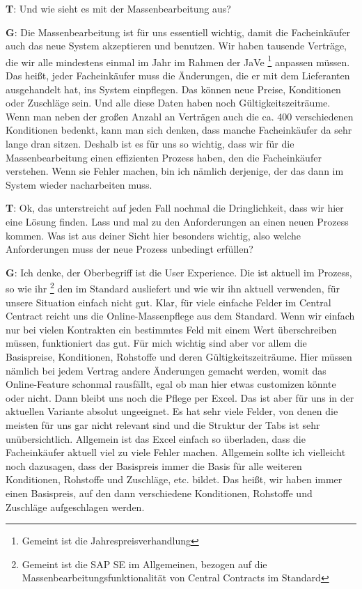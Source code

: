 \begin{list}{X:}{\setlength{\labelsep}{5mm}}
 \item[\textbf{T}:] Und wie sieht es mit der Massenbearbeitung aus?
 \item[\textbf{G}:] Die Massenbearbeitung ist für uns essentiell wichtig, damit die Facheinkäufer auch das neue System akzeptieren und benutzen. Wir haben tausende Verträge, die wir alle mindestens einmal im Jahr im Rahmen der JaVe \footnote{Gemeint ist die Jahrespreisverhandlung} anpassen müssen. Das hei\ss t, jeder Facheinkäufer muss die Änderungen, die er mit dem Lieferanten ausgehandelt hat, ins System einpflegen. Das können neue Preise, Konditionen oder Zuschläge sein. Und alle diese Daten haben noch Gültigkeitszeiträume. Wenn man neben der gro\ss en Anzahl an Verträgen auch die ca. 400 verschiedenen Konditionen bedenkt, kann man sich denken, dass manche Facheinkäufer da sehr lange dran sitzen. Deshalb ist es für uns so wichtig, dass wir für die Massenbearbeitung einen effizienten Prozess haben, den die Facheinkäufer verstehen. Wenn sie Fehler machen, bin ich nämlich derjenige, der das dann im System wieder nacharbeiten muss.
 \item[\textbf{T}:] Ok, das unterstreicht auf jeden Fall nochmal die Dringlichkeit, dass wir hier eine Lösung finden. Lass und mal zu den Anforderungen an einen neuen Prozess kommen. Was ist aus deiner Sicht hier besonders wichtig, also welche Anforderungen muss der neue Prozess unbedingt erfüllen?
 \item[\textbf{G}:] Ich denke, der Oberbegriff ist die User Experience. Die ist aktuell im Prozess, so wie ihr \footnote{Gemeint ist die SAP SE im Allgemeinen, bezogen auf die Massenbearbeitungsfunktionalität von Central Contracts im Standard} den im Standard ausliefert und wie wir ihn aktuell verwenden, für unsere Situation einfach nicht gut. Klar, für viele einfache Felder im Central Centract reicht uns die Online-Massenpflege aus dem Standard. Wenn wir einfach nur bei vielen Kontrakten ein bestimmtes Feld mit einem Wert überschreiben müssen, funktioniert das gut. Für mich wichtig sind aber vor allem die Basispreise, Konditionen, Rohstoffe und deren Gültigkeitszeiträume. Hier müssen nämlich bei jedem Vertrag andere Änderungen gemacht werden, womit das Online-Feature schonmal rausfällt, egal ob man hier etwas customizen könnte oder nicht. Dann bleibt uns noch die Pflege per Excel. Das ist aber für uns in der aktuellen Variante absolut ungeeignet. Es hat sehr viele Felder, von denen die meisten für uns gar nicht relevant sind und die Struktur der Tabs ist sehr unübersichtlich. Allgemein ist das Excel einfach so überladen, dass die Facheinkäufer aktuell viel zu viele Fehler machen. Allgemein sollte ich vielleicht noch dazusagen, dass der Basispreis immer die Basis für alle weiteren Konditionen, Rohstoffe und Zuschläge, etc. bildet. Das hei\ss t, wir haben immer einen Basispreis, auf den dann verschiedene Konditionen, Rohstoffe und Zuschläge aufgeschlagen werden.

\end{list}
